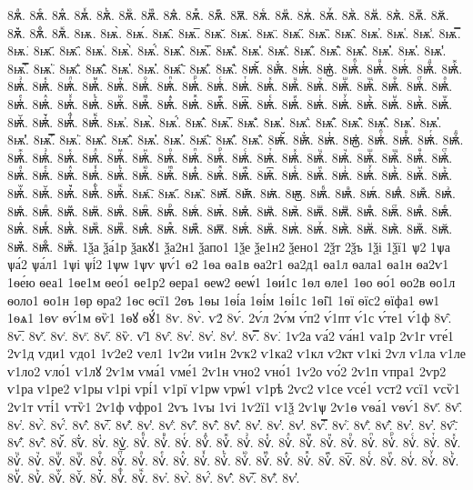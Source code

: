 {8ѫⷶ.
8ѫⷷ.
8ѫⷸ.
8ѫⷹ.
8ѫⷺ.
8ѫⷻ.
8ѫⷼ.
8ѫⷽ.
8ѫⷾ.
8ѫⷿ.
8ѫ꙯.
8ѫꙴ.
8ѫꙵ.
8ѫꙶ.
8ѫꙷ.
8ѫꙸ.
8ѫꙹ.
8ѫꙺ.
8ѫꙻ.
8ѫ꙼.
8ѫ꙽.
8ѫꚞ.
8ѫꚟ.
8ѭ.
8ѭ̀.
8ѭ́.
8ѭ̂.
8ѭ̅.
8ѭ̆.
8ѭ̇.
8ѭ̈.
8ѭ̋.
8ѭ̏.
8ѭ̑.
8ѭ̓.
8ѭ̔.
8ѭ̾.
8ѭ̿.
8ѭ͘.
8ѭ҃.
8ѭ҄.
8ѭ҅.
8ѭ҅̀.
8ѭ҅́.
8ѭ҅̂.
8ѭ҅̅.
8ѭ҅̆.
8ѭ҅̇.
8ѭ҅̈.
8ѭ҅̋.
8ѭ҅̏.
8ѭ҅̑.
8ѭ҅̓.
8ѭ҅̔.
8ѭ҅̾.
8ѭ҅̿.
8ѭ҅͘.
8ѭ҅҃.
8ѭ҅҄.
8ѭ҅҅.
8ѭ҅҆.
8ѭ҅҇.
8ѭ҅᷀.
8ѭ҅᷁.
8ѭ҅᷶.
8ѭ᷷҅.
8ѭ᷸҅.
8ѭ᷹҅.
8ѭ҅ⷠ.
8ѭ҅ⷡ.
8ѭ҅ⷢ.
8ѭ҅ⷣ.
8ѭ҅ⷤ.
8ѭ҅ⷥ.
8ѭ҅ⷦ.
8ѭ҅ⷧ.
8ѭ҅ⷨ.
8ѭ҅ⷩ.
8ѭ҅ⷪ.
8ѭ҅ⷫ.
8ѭ҅ⷬ.
8ѭ҅ⷭ.
8ѭ҅ⷮ.
8ѭ҅ⷯ.
8ѭ҅ⷰ.
8ѭ҅ⷱ.
8ѭ҅ⷲ.
8ѭ҅ⷳ.
8ѭ҅ⷴ.
8ѭ҅ⷵ.
8ѭ҅ⷶ.
8ѭ҅ⷷ.
8ѭ҅ⷸ.
8ѭ҅ⷹ.
8ѭ҅ⷺ.
8ѭ҅ⷻ.
8ѭ҅ⷼ.
8ѭ҅ⷽ.
8ѭ҅ⷾ.
8ѭ҅ⷿ.
8ѭ҅꙯.
8ѭ҅ꙴ.
8ѭ҅ꙵ.
8ѭ҅ꙶ.
8ѭ҅ꙷ.
8ѭ҅ꙸ.
8ѭ҅ꙹ.
8ѭ҅ꙺ.
8ѭ҅ꙻ.
8ѭ҅꙼.
8ѭ҅꙽.
8ѭ҅ꚞ.
8ѭ҅ꚟ.
8ѭ҆.
8ѭ҆̀.
8ѭ҆́.
8ѭ҆̂.
8ѭ҆̅.
8ѭ҆̆.
8ѭ҆̇.
8ѭ҆̈.
8ѭ҆̋.
8ѭ҆̏.
8ѭ҆̑.
8ѭ҆̓.
8ѭ҆̔.
8ѭ҆̾.
8ѭ҆̿.
8ѭ҆͘.
8ѭ҆҃.
8ѭ҆҄.
8ѭ҆҅.
8ѭ҆҆.
8ѭ҆҇.
8ѭ҆᷀.
8ѭ҆᷁.
8ѭ҆᷶.
8ѭ᷷҆.
8ѭ᷸҆.
8ѭ᷹҆.
8ѭ҆ⷠ.
8ѭ҆ⷡ.
8ѭ҆ⷢ.
8ѭ҆ⷣ.
8ѭ҆ⷤ.
8ѭ҆ⷥ.
8ѭ҆ⷦ.
8ѭ҆ⷧ.
8ѭ҆ⷨ.
8ѭ҆ⷩ.
8ѭ҆ⷪ.
8ѭ҆ⷫ.
8ѭ҆ⷬ.
8ѭ҆ⷭ.
8ѭ҆ⷮ.
8ѭ҆ⷯ.
8ѭ҆ⷰ.
8ѭ҆ⷱ.
8ѭ҆ⷲ.
8ѭ҆ⷳ.
8ѭ҆ⷴ.
8ѭ҆ⷵ.
8ѭ҆ⷶ.
8ѭ҆ⷷ.
8ѭ҆ⷸ.
8ѭ҆ⷹ.
8ѭ҆ⷺ.
8ѭ҆ⷻ.
8ѭ҆ⷼ.
8ѭ҆ⷽ.
8ѭ҆ⷾ.
8ѭ҆ⷿ.
8ѭ҆꙯.
8ѭ҆ꙴ.
8ѭ҆ꙵ.
8ѭ҆ꙶ.
8ѭ҆ꙷ.
8ѭ҆ꙸ.
8ѭ҆ꙹ.
8ѭ҆ꙺ.
8ѭ҆ꙻ.
8ѭ҆꙼.
8ѭ҆꙽.
8ѭ҆ꚞ.
8ѭ҆ꚟ.
8ѭ҇.
8ѭ᷀.
8ѭ᷁.
8ѭ᷶.
8ѭ᷷.
8ѭ᷸.
8ѭ᷹.
8ѭⷠ.
8ѭⷡ.
8ѭⷢ.
8ѭⷣ.
8ѭⷤ.
8ѭⷥ.
8ѭⷦ.
8ѭⷧ.
8ѭⷨ.
8ѭⷩ.
8ѭⷪ.
8ѭⷫ.
8ѭⷬ.
8ѭⷭ.
8ѭⷮ.
8ѭⷯ.
8ѭⷰ.
8ѭⷱ.
8ѭⷲ.
8ѭⷳ.
8ѭⷴ.
8ѭⷵ.
8ѭⷶ.
8ѭⷷ.
8ѭⷸ.
8ѭⷹ.
8ѭⷺ.
8ѭⷻ.
8ѭⷼ.
8ѭⷽ.
8ѭⷾ.
8ѭⷿ.
8ѭ꙯.
8ѭꙴ.
8ѭꙵ.
8ѭꙶ.
8ѭꙷ.
8ѭꙸ.
8ѭꙹ.
8ѭꙺ.
8ѭꙻ.
8ѭ꙼.
8ѭ꙽.
8ѭꚞ.
8ѭꚟ.
1ѯа
ѯа́1р
ѯакꙋ1
ѯа2н1
ѯапо1
1ѯе
ѯе1н2
ѯено1
2ѯт
2ѯъ
1ѯі
1ѯї1
ѱ2
1ѱа
ѱа́2
ѱа́л1
1ѱі
ѱі́2
1ѱѡ
1ѱѵ
ѱѵ́1
ѳ2
1ѳа
ѳа1в
ѳа2г1
ѳа2д1
ѳа1л
ѳала1
ѳа1н
ѳа2ѵ1
1ѳе́ю
ѳеа1
1ѳе1м
ѳео́1
ѳе1р2
ѳера1
ѳеѡ2
ѳеѡ́1
1ѳи́1с
1ѳл
ѳле1
1ѳо
ѳо́1
ѳо2в
ѳо1л
ѳоло1
ѳо1н
1ѳр
ѳра2
1ѳс
ѳсї1
2ѳъ
1ѳы
1ѳі́а
1ѳі́м
1ѳі́1с
1ѳі̑1
1ѳї
ѳїс2
ѳїфа1
ѳѡ1
1ѳѧ1
1ѳѵ
ѳѵ́1м
ѳѷ1
1ѳꙋ
ѳꙋ́1
8ѵ.
8ѵ̀.
ѵ2́
8ѵ́.
2ѵ́л
2ѵ́м
ѵ́п2
ѵ́1пт
ѵ́1с
ѵ́те1
ѵ́1ф
8ѵ̂.
8ѵ̅.
8ѵ̆.
8ѵ̇.
8ѵ̈.
8ѵ̋.
8ѷ.
ѵ̑1
8ѵ̑.
8ѵ̓.
8ѵ̔.
8ѵ̾.
8ѵ̿.
8ѵ͘.
1ѵ2а
ѵа́2
ѵа́н1
ѵа1р
2ѵ1г
ѵге́1
2ѵ1д
ѵди1
ѵдо1
1ѵ2е2
ѵел1
1ѵ2и
ѵи1н
2ѵк2
ѵ1ка2
ѵ1кл
ѵ2кт
ѵ1кі
2ѵл
ѵ1ла
ѵ1ле
ѵ1ло2
ѵло́1
ѵ1лꙋ
2ѵ1м
ѵма́1
ѵме́1
2ѵ1н
ѵно2
ѵно́1
1ѵ2о
ѵо́2
2ѵ1п
ѵпра1
2ѵр2
ѵ1ра
ѵ1ре2
ѵ1ры
ѵ1рі
ѵрі́1
ѵ1рї
ѵ1рѡ
ѵрѡ́1
ѵ1рѣ
2ѵс2
ѵ1се
ѵсе́1
ѵст2
ѵсї1
ѵсѷ1
2ѵ1т
ѵті́1
ѵтѷ1
2ѵ1ф
ѵфро1
2ѵъ
1ѵы
1ѵі
1ѵ2ї1
ѵ1ѯ
2ѵ1ѱ
2ѵ1ѳ
ѵѳа́1
ѵѳѵ́1
8ѵ҃.
8ѵ҄.
8ѵ҅.
8ѵ҅̀.
8ѵ҅́.
8ѵ҅̂.
8ѵ҅̅.
8ѵ҅̆.
8ѵ҅̇.
8ѵ҅̈.
8ѵ҅̋.
8ѵ҅̏.
8ѵ҅̑.
8ѵ҅̓.
8ѵ҅̔.
8ѵ҅̾.
8ѵ҅̿.
8ѵ҅͘.
8ѵ҅҃.
8ѵ҅҄.
8ѵ҅҅.
8ѵ҅҆.
8ѵ҅҇.
8ѵ҅᷀.
8ѵ҅᷁.
8ѵ҅᷶.
8ѵ᷷҅.
8ѵ᷸҅.
8ѵ᷹҅.
8ѵ҅ⷠ.
8ѵ҅ⷡ.
8ѵ҅ⷢ.
8ѵ҅ⷣ.
8ѵ҅ⷤ.
8ѵ҅ⷥ.
8ѵ҅ⷦ.
8ѵ҅ⷧ.
8ѵ҅ⷨ.
8ѵ҅ⷩ.
8ѵ҅ⷪ.
8ѵ҅ⷫ.
8ѵ҅ⷬ.
8ѵ҅ⷭ.
8ѵ҅ⷮ.
8ѵ҅ⷯ.
8ѵ҅ⷰ.
8ѵ҅ⷱ.
8ѵ҅ⷲ.
8ѵ҅ⷳ.
8ѵ҅ⷴ.
8ѵ҅ⷵ.
8ѵ҅ⷶ.
8ѵ҅ⷷ.
8ѵ҅ⷸ.
8ѵ҅ⷹ.
8ѵ҅ⷺ.
8ѵ҅ⷻ.
8ѵ҅ⷼ.
8ѵ҅ⷽ.
8ѵ҅ⷾ.
8ѵ҅ⷿ.
8ѵ҅꙯.
8ѵ҅ꙴ.
8ѵ҅ꙵ.
8ѵ҅ꙶ.
8ѵ҅ꙷ.
8ѵ҅ꙸ.
8ѵ҅ꙹ.
8ѵ҅ꙺ.
8ѵ҅ꙻ.
8ѵ҅꙼.
8ѵ҅꙽.
8ѵ҅ꚞ.
8ѵ҅ꚟ.
8ѵ҆.
8ѵ҆̀.
8ѵ҆́.
8ѵ҆̂.
8ѵ҆̅.
8ѵ҆̆.
8ѵ҆̇.
}
